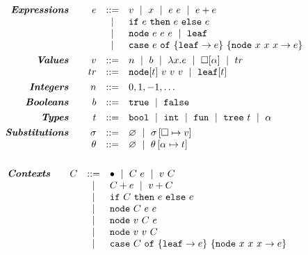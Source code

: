 \begin{figure}
$$
\begin{array}{rrcl}

\emphbf{Expressions} \quad
  & e & ::=    & v \spmid x \spmid \eapp{e}{e} \spmid \eplus{e}{e}\\
  &   & \spmid & \eif{e}{e}{e} \\
  &   & \spmid & \enode{e}{e}{e} \spmid \eleaf \\
  &   & \spmid & \ecase{e}{e}{x}{x}{x}{e} \\[0.05in]

\emphbf{Values} \quad
  & v  & ::= & n \spmid b \spmid \efun{x}{e} \spmid \vhole{\thole} \spmid tr \\
  & tr & ::= & \vnode{t}{v}{v}{v} \spmid \vleaf{t} \\[0.05in]

\emphbf{Integers} \quad
  & n & ::= &  0,1,-1,\ldots \\[0.05in]

\emphbf{Booleans} \quad
  & b & ::= &  \etrue \spmid \efalse \\[0.05in]

\emphbf{Types} \quad
  & t & ::= & \tbool \spmid \tint \spmid \tfun \spmid \ttree{t} \spmid \thole \\[0.05in]

\emphbf{Substitutions} \quad
  & \vsu & ::= & \emptysu \spmid \extendsu{\vsu}{\ehole}{v} \\
  & \tsu & ::= & \emptysu \spmid \extendsu{\tsu}{\thole}{t} \\[0.1in]
\end{array}
$$

$$
\begin{array}{rrcl}
\textbf{\emph{Contexts}} \quad
  & C
  & ::=
  &   	 \bullet
  \ \mid \  C\ e
  \ \mid \  v\ C \\
  & & \ \mid \  & C + e \ \mid \  v + C \\
  & & \ \mid \  & \mathtt{if}\ C\ \mathtt{then}\ e\ \mathtt{else}\ e \\
  & & \ \mid \  & \mathtt{node}\ C\ e\ e \\
  & & \ \mid \  & \mathtt{node}\ v\ C\ e \\
  & & \ \mid \  & \mathtt{node}\ v\ v\ C \\
  & & \ \mid \  & \mathtt{case}\ C\ \mathtt{of}\ \{\mathtt{leaf} \to e\}\ \{\mathtt{node}\ x\ x\ x \to e\}
  \\[0.05in]
\end{array}
$$


\end{figure}
